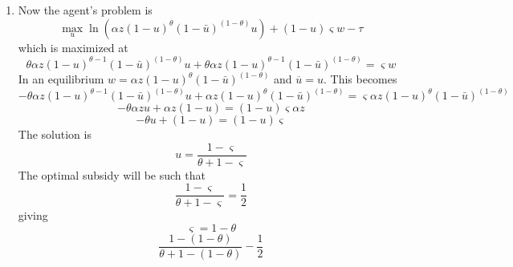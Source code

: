\documentclass{article}
\begin{document}
\begin{enumerate}
\begin{enumerate}
\item Now the agent's problem is 
\begin{equation*}
\underset{u}{\max }\ln \left( \alpha z(1-u)^{\theta }\left( 1-\bar{u}\right)
^{\left( 1-\theta \right) }u\right) +(1-u)\varsigma w-\tau
\end{equation*}%
which is maximized at 
\begin{equation*}
\theta \alpha z(1-u)^{\theta -1}\left( 1-\bar{u}\right) ^{\left( 1-\theta
\right) }u+\theta \alpha z(1-u)^{\theta -1}\left( 1-\bar{u}\right) ^{\left(
1-\theta \right) }=\varsigma w
\end{equation*}%
In an equilibrium $w=\alpha z(1-u)^{\theta }\left( 1-\bar{u}\right) ^{\left(
1-\theta \right) }$ and $\overline{u}=u.$ This becomes%
\begin{equation*}
-\theta \alpha z(1-u)^{\theta -1}\left( 1-\bar{u}\right) ^{\left( 1-\theta
\right) }u+\alpha z(1-u)^{\theta }\left( 1-\bar{u}\right) ^{\left( 1-\theta
\right) }=\varsigma \alpha z(1-u)^{\theta }\left( 1-\bar{u}\right) ^{\left(
1-\theta \right) }
\end{equation*}%
\begin{equation*}
-\theta \alpha zu+\alpha z(1-u)=(1-u)\varsigma \alpha z
\end{equation*}%
\begin{equation*}
-\theta u+(1-u)=(1-u)\varsigma
\end{equation*}%
$\allowbreak $The solution is 
\begin{equation*}
u=\frac{1-\varsigma }{\theta +1-\varsigma }
\end{equation*}%
The optimal subsidy will be such that 
\begin{equation*}
\frac{1-\varsigma }{\theta +1-\varsigma }=\frac{1}{2}
\end{equation*}%
giving%
\begin{equation*}
\varsigma =1-\theta
\end{equation*}%
\begin{equation*}
\frac{1-\left( 1-\theta \right) }{\theta +1-\left( 1-\theta \right) }-\frac{1%
}{2}
\end{equation*}


\end{enumerate}
\end{enumerate}
\end{document}
